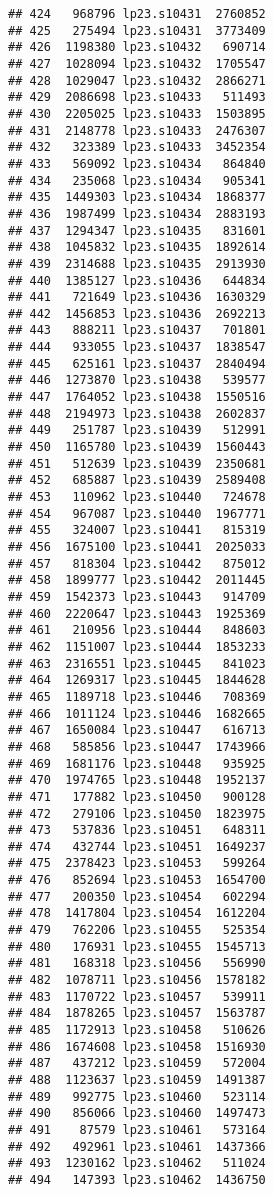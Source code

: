 \documentclass[
]{article}
\begin{document}
\begin{verbatim}
## 424   968796 lp23.s10431  2760852
## 425   275494 lp23.s10431  3773409
## 426  1198380 lp23.s10432   690714
## 427  1028094 lp23.s10432  1705547
## 428  1029047 lp23.s10432  2866271
## 429  2086698 lp23.s10433   511493
## 430  2205025 lp23.s10433  1503895
## 431  2148778 lp23.s10433  2476307
## 432   323389 lp23.s10433  3452354
## 433   569092 lp23.s10434   864840
## 434   235068 lp23.s10434   905341
## 435  1449303 lp23.s10434  1868377
## 436  1987499 lp23.s10434  2883193
## 437  1294347 lp23.s10435   831601
## 438  1045832 lp23.s10435  1892614
## 439  2314688 lp23.s10435  2913930
## 440  1385127 lp23.s10436   644834
## 441   721649 lp23.s10436  1630329
## 442  1456853 lp23.s10436  2692213
## 443   888211 lp23.s10437   701801
## 444   933055 lp23.s10437  1838547
## 445   625161 lp23.s10437  2840494
## 446  1273870 lp23.s10438   539577
## 447  1764052 lp23.s10438  1550516
## 448  2194973 lp23.s10438  2602837
## 449   251787 lp23.s10439   512991
## 450  1165780 lp23.s10439  1560443
## 451   512639 lp23.s10439  2350681
## 452   685887 lp23.s10439  2589408
## 453   110962 lp23.s10440   724678
## 454   967087 lp23.s10440  1967771
## 455   324007 lp23.s10441   815319
## 456  1675100 lp23.s10441  2025033
## 457   818304 lp23.s10442   875012
## 458  1899777 lp23.s10442  2011445
## 459  1542373 lp23.s10443   914709
## 460  2220647 lp23.s10443  1925369
## 461   210956 lp23.s10444   848603
## 462  1151007 lp23.s10444  1853233
## 463  2316551 lp23.s10445   841023
## 464  1269317 lp23.s10445  1844628
## 465  1189718 lp23.s10446   708369
## 466  1011124 lp23.s10446  1682665
## 467  1650084 lp23.s10447   616713
## 468   585856 lp23.s10447  1743966
## 469  1681176 lp23.s10448   935925
## 470  1974765 lp23.s10448  1952137
## 471   177882 lp23.s10450   900128
## 472   279106 lp23.s10450  1823975
## 473   537836 lp23.s10451   648311
## 474   432744 lp23.s10451  1649237
## 475  2378423 lp23.s10453   599264
## 476   852694 lp23.s10453  1654700
## 477   200350 lp23.s10454   602294
## 478  1417804 lp23.s10454  1612204
## 479   762206 lp23.s10455   525354
## 480   176931 lp23.s10455  1545713
## 481   168318 lp23.s10456   556990
## 482  1078711 lp23.s10456  1578182
## 483  1170722 lp23.s10457   539911
## 484  1878265 lp23.s10457  1563787
## 485  1172913 lp23.s10458   510626
## 486  1674608 lp23.s10458  1516930
## 487   437212 lp23.s10459   572004
## 488  1123637 lp23.s10459  1491387
## 489   992775 lp23.s10460   523114
## 490   856066 lp23.s10460  1497473
## 491    87579 lp23.s10461   573164
## 492   492961 lp23.s10461  1437366
## 493  1230162 lp23.s10462   511024
## 494   147393 lp23.s10462  1436750

\end{verbatim}
\end{document}
